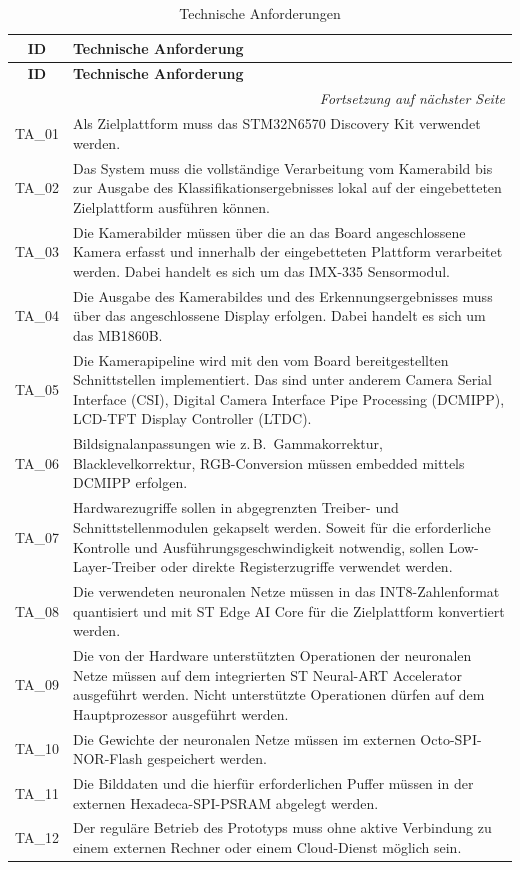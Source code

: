 \begin{longtable}{|c|p{}|}
    \caption{Technische Anforderungen}
    \label{tab:technische-anforderungen} \\
    \hline
    \textbf{ID} & \textbf{Technische Anforderung} \\
    \hline
    \endfirsthead
    \hline
    \textbf{ID} & \textbf{Technische Anforderung} \\
    \hline
    \endhead
    \hline
    \multicolumn{2}{r}{\textit{Fortsetzung auf nächster Seite}} \\
    \endfoot
    \hline
    \endlastfoot
    TA\_01 & Als Zielplattform muss das STM32N6570 Discovery Kit verwendet werden. \\
    \hline
    TA\_02 & Das System muss die vollständige Verarbeitung vom Kamerabild bis zur Ausgabe des Klassifikationsergebnisses lokal auf der eingebetteten Zielplattform ausführen können. \\
    \hline
    TA\_03 & Die Kamerabilder müssen über die an das Board angeschlossene Kamera erfasst und innerhalb der eingebetteten Plattform verarbeitet werden. Dabei handelt es sich um das IMX-335 Sensormodul. \\
    \hline
    TA\_04 & Die Ausgabe des Kamerabildes und des Erkennungsergebnisses muss über das angeschlossene Display erfolgen. Dabei handelt es sich um das MB1860B. \\
    \hline
    TA\_05 & Die Kamerapipeline wird mit den vom Board bereitgestellten Schnittstellen implementiert. Das sind unter anderem Camera Serial Interface (CSI), Digital Camera Interface Pipe Processing (DCMIPP), LCD-TFT Display Controller (LTDC). \\
    \hline
    TA\_06 & Bildsignalanpassungen wie z.\,B.\ Gammakorrektur, Blacklevelkorrektur, RGB-Conversion müssen embedded mittels DCMIPP erfolgen. \\
    \hline
    TA\_07 & Hardwarezugriffe sollen in abgegrenzten Treiber- und Schnittstellenmodulen gekapselt werden. Soweit für die erforderliche Kontrolle und Ausführungsgeschwindigkeit notwendig, sollen Low-Layer-Treiber oder direkte Registerzugriffe verwendet werden. \\
    \hline
    TA\_08 & Die verwendeten neuronalen Netze müssen in das INT8-Zahlenformat quantisiert und mit ST Edge AI Core für die Zielplattform konvertiert werden. \\
    \hline
    TA\_09 & Die von der Hardware unterstützten Operationen der neuronalen Netze müssen auf dem integrierten ST Neural-ART Accelerator ausgeführt werden. Nicht unterstützte Operationen dürfen auf dem Hauptprozessor ausgeführt werden. \\
    \hline
    TA\_10 & Die Gewichte der neuronalen Netze müssen im externen Octo-SPI-NOR-Flash gespeichert werden. \\
    \hline
    TA\_11 & Die Bilddaten und die hierfür erforderlichen Puffer müssen in der externen Hexadeca-SPI-PSRAM abgelegt werden. \\
    \hline
    TA\_12 & Der reguläre Betrieb des Prototyps muss ohne aktive Verbindung zu einem externen Rechner oder einem Cloud-Dienst möglich sein. \\
    \hline
\end{longtable}

